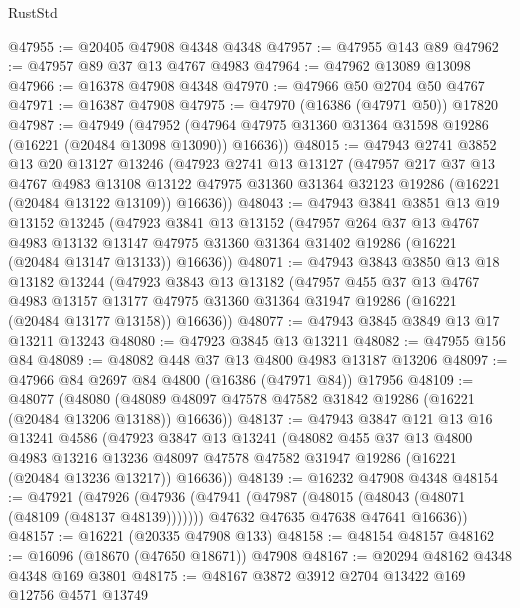 \begin{lexlean}{RustStd}
\begin{coremodule}
@47955 := @20405 @47908 @4348 @4348
@47957 := @47955 @143 @89
@47962 := @47957 @89 @37 @13 @4767 @4983
@47964 := @47962 @13089 @13098
@47966 := @16378 @47908 @4348
@47970 := @47966 @50 @2704 @50 @4767
@47971 := @16387 @47908
@47975 := @47970 (@16386 (@47971 @50)) @17820
@47987 := @47949
    (@47952 (@47964 @47975 @31360 @31364 @31598 @19286 (@16221 (@20484 @13098 @13090)) @16636))
@48015 := @47943
    @2741
    @3852
    @13
    @20
    @13127
    @13246
    (@47923
      @2741
      @13
      @13127
      (@47957
        @217
        @37
        @13
        @4767
        @4983
        @13108
        @13122
        @47975
        @31360
        @31364
        @32123
        @19286
        (@16221 (@20484 @13122 @13109))
        @16636))
@48043 := @47943
    @3841
    @3851
    @13
    @19
    @13152
    @13245
    (@47923
      @3841
      @13
      @13152
      (@47957
        @264
        @37
        @13
        @4767
        @4983
        @13132
        @13147
        @47975
        @31360
        @31364
        @31402
        @19286
        (@16221 (@20484 @13147 @13133))
        @16636))
@48071 := @47943
    @3843
    @3850
    @13
    @18
    @13182
    @13244
    (@47923
      @3843
      @13
      @13182
      (@47957
        @455
        @37
        @13
        @4767
        @4983
        @13157
        @13177
        @47975
        @31360
        @31364
        @31947
        @19286
        (@16221 (@20484 @13177 @13158))
        @16636))
@48077 := @47943 @3845 @3849 @13 @17 @13211 @13243
@48080 := @47923 @3845 @13 @13211
@48082 := @47955 @156 @84
@48089 := @48082 @448 @37 @13 @4800 @4983 @13187 @13206
@48097 := @47966 @84 @2697 @84 @4800 (@16386 (@47971 @84)) @17956
@48109 := @48077
    (@48080 (@48089 @48097 @47578 @47582 @31842 @19286 (@16221 (@20484 @13206 @13188)) @16636))
@48137 := @47943
    @3847
    @121
    @13
    @16
    @13241
    @4586
    (@47923
      @3847
      @13
      @13241
      (@48082
        @455
        @37
        @13
        @4800
        @4983
        @13216
        @13236
        @48097
        @47578
        @47582
        @31947
        @19286
        (@16221 (@20484 @13236 @13217))
        @16636))
@48139 := @16232 @47908 @4348
@48154 := @47921
    (@47926
      (@47936
        (@47941 (@47987 (@48015 (@48043 (@48071 (@48109 (@48137 @48139)))))))
        @47632
        @47635
        @47638
        @47641
        @16636))
@48157 := @16221 (@20335 @47908 @133)
@48158 := @48154 @48157
@48162 := @16096 (@18670 (@47650 @18671)) @47908
@48167 := @20294 @48162 @4348 @4348 @169 @3801
@48175 := @48167 @3872 @3912 @2704 @13422 @169 @12756 @4571 @13749

\end{coremodule}
\end{lexlean}
